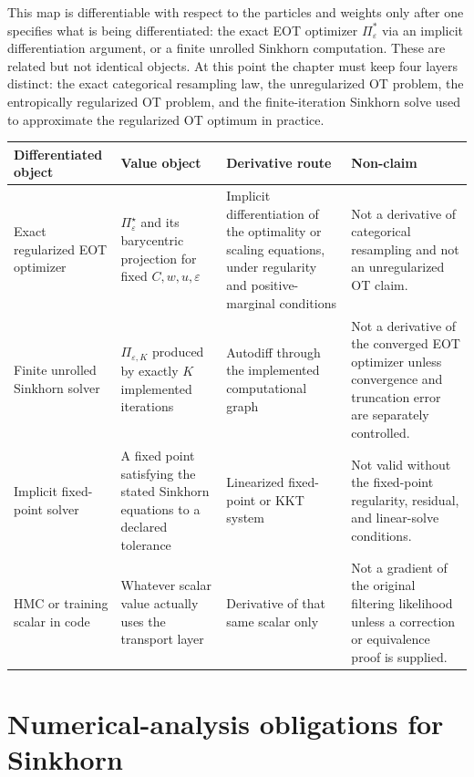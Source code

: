 This map is differentiable with respect to the particles and weights only after
one specifies what is being differentiated: the exact EOT optimizer
$\Pi_\varepsilon^*$ via an implicit differentiation argument, or a finite
unrolled Sinkhorn computation.  These are related but not identical objects.
At this point the chapter must keep four layers distinct: the exact categorical
resampling law, the unregularized OT problem, the entropically regularized OT
problem, and the finite-iteration Sinkhorn solve used to approximate the
regularized OT optimum in practice.

\begin{center}
\scriptsize
\begin{tabular}{p{} p{} p{} p{}}
\toprule
Differentiated object & Value object & Derivative route & Non-claim \\
\midrule
Exact regularized EOT optimizer &
$\Pi_\varepsilon^\star$ and its barycentric projection for fixed
$C,w,u,\varepsilon$ &
Implicit differentiation of the optimality or scaling equations, under
regularity and positive-marginal conditions &
Not a derivative of categorical resampling and not an unregularized OT claim. \\
Finite unrolled Sinkhorn solver &
$\Pi_{\varepsilon,K}$ produced by exactly $K$ implemented iterations &
Autodiff through the implemented computational graph &
Not a derivative of the converged EOT optimizer unless convergence and
truncation error are separately controlled. \\
Implicit fixed-point solver &
A fixed point satisfying the stated Sinkhorn equations to a declared tolerance &
Linearized fixed-point or KKT system &
Not valid without the fixed-point regularity, residual, and linear-solve
conditions. \\
HMC or training scalar in code &
Whatever scalar value actually uses the transport layer &
Derivative of that same scalar only &
Not a gradient of the original filtering likelihood unless a correction or
equivalence proof is supplied. \\
\bottomrule
\end{tabular}
\end{center}

\section{Numerical-analysis obligations for Sinkhorn}
\label{sec:bf-dr-sinkhorn-numerics}

